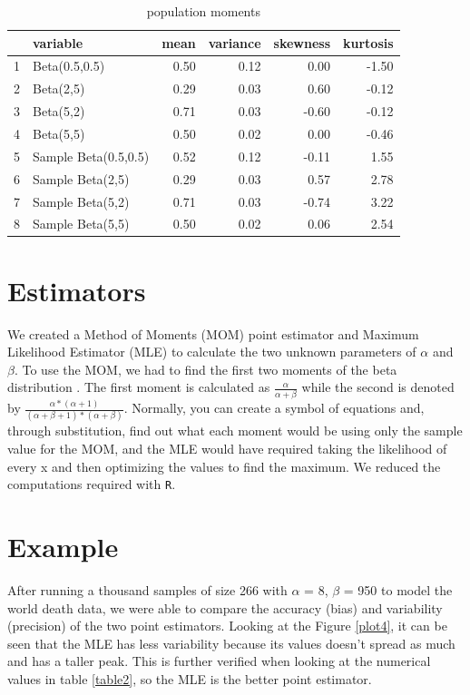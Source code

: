 \documentclass{article}\usepackage[]{graphicx}\usepackage[]{xcolor}
\begin{document}
\begin{multicols}{2}
\begin{table}[H]
\centering
\begin{tabular}{rlrrrr}
  \hline
 & variable & mean & variance & skewness & kurtosis \\ 
  \hline
1 & Beta(0.5,0.5) & 0.50 & 0.12 & 0.00 & -1.50 \\ 
  2 & Beta(2,5) & 0.29 & 0.03 & 0.60 & -0.12 \\ 
  3 & Beta(5,2) & 0.71 & 0.03 & -0.60 & -0.12 \\ 
  4 & Beta(5,5) & 0.50 & 0.02 & 0.00 & -0.46 \\ 
  5 & Sample Beta(0.5,0.5) & 0.52 & 0.12 & -0.11 & 1.55 \\ 
  6 & Sample Beta(2,5) & 0.29 & 0.03 & 0.57 & 2.78 \\ 
  7 & Sample Beta(5,2) & 0.71 & 0.03 & -0.74 & 3.22 \\ 
  8 & Sample Beta(5,5) & 0.50 & 0.02 & 0.06 & 2.54 \\ 
   \hline
\end{tabular} \caption{population moments } \label{table1}
\end{table}

\section{Estimators}
We created a Method of Moments (MOM) point estimator and Maximum Likelihood Estimator (MLE) to calculate the two unknown parameters of $\alpha$ and $\beta$. To use the MOM, we had to find the first two moments of the beta distribution . The first moment is calculated as $\frac{\alpha}{\alpha + \beta}$ while the second is denoted by $\frac {\alpha * (\alpha +1)}{(\alpha + \beta + 1) * (\alpha +\beta)}$. Normally, you can create a symbol of equations and, through substitution, find out what each moment would be using only the sample value for the MOM, and the MLE would have required taking the likelihood of every x and then optimizing the values to find the maximum. We reduced the computations required with \texttt{R}. 






\section{Example}
After running a thousand samples of size 266 with $\alpha$ = 8, $\beta$ = 950 to model the world death data, we were able to compare the accuracy (bias) and variability (precision) of the two point estimators. Looking at the Figure \ref{plot4}, it can be seen that the MLE has less variability because its values doesn't spread as much and has a taller peak. This is further verified when looking at the numerical values in table \ref{table2}, so the MLE is the better point estimator.



\end{multicols}
\end{document}
